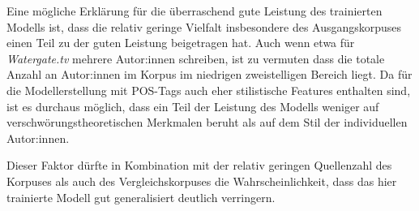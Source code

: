 Eine mögliche Erklärung für die überraschend gute Leistung des trainierten Modells ist, dass die relativ geringe Vielfalt insbesondere des Ausgangskorpuses einen Teil zu der guten Leistung beigetragen hat.
Auch wenn etwa für \textit{Watergate.tv} mehrere Autor:innen schreiben, ist zu vermuten dass die totale Anzahl an Autor:innen im Korpus im niedrigen zweistelligen Bereich liegt.
Da für die Modellerstellung mit POS-Tags auch eher stilistische Features enthalten sind, ist es durchaus möglich, dass ein Teil der Leistung des Modells weniger auf verschwörungstheoretischen Merkmalen beruht als auf dem Stil der individuellen Autor:innen.

Dieser Faktor dürfte in Kombination mit der relativ geringen Quellenzahl des Korpuses als auch des Vergleichskorpuses die Wahrscheinlichkeit, dass das hier trainierte Modell gut generalisiert deutlich verringern.